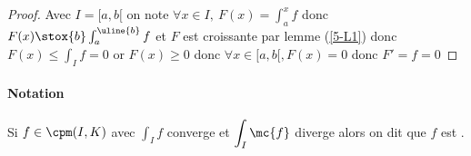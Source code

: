 		${}$\\ 
		\begin{proof}
		Avec $I=[a,b[$ on note $\forall x\in I ,~F(x) = \int_a^x f$ donc $F(x) \stox{b} \int_a^{\uline{b}} f$ et $F$ est croissante par lemme 
		(\ref{5-L1}) donc $F(x) \leq \int_I f = 0$ or $F(x) \geq 0$ donc $\forall x\in [a,b[, F(x) = 0$ donc $F'=f=0$
		\end{proof}
		\paragraph{Notation} Si $f\in\cpm(I,K)$ avec $\displaystyle{\int_I f}$ converge et $\displaystyle{\int_I \mc{f} }$ diverge alors on dit que 
		$f$ est .
